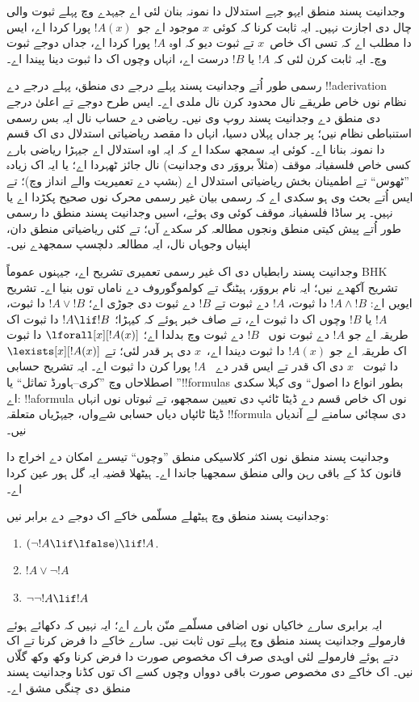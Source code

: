 \documentclass[../../../include/open-logic-section]{subfiles}
\begin{document}
وجدانیت پسند
منطق ایہو
جہے استدلال
دا نمونہ
بنان لئی
اے جیہدے
وچ پہلے
ثبوت والی
چال دی
اجازت نہیں۔
ایہ ثابت
کرنا کہ
کوئی $x$
موجود اے
جو~$!A(x)$
پورا کردا
اے، ایس
دا مطلب
اے کہ
تسی اک
خاص~$x$
تے ثبوت
دیو کہ
اوہ $!A$
پورا کردا
اے، جداں
دوجے ثبوت
وچ۔ ایہ
ثابت کرن
لئی کہ
$!A$ یا
$!B$ درست
اے، انہاں
وچوں اک
دا ثبوت
دینا پیندا
اے۔

رسمی طور
اُتے وجدانیت
پسند پہلے
درجے دی
منطق، پہلے
درجے دے
!!a{derivation}
نظام نوں
خاص طریقے
نال محدود
کرن نال
ملدی اے۔
ایس طرح
دوجے تے
اعلیٰ درجے
دی منطق
دے وجدانیت
پسند روپ
وی نیں۔
ریاضی دے
حساب نال
ایہ بس
رسمی استنباطی
نظام نیں؛
پر جداں
پہلاں دسیا،
انہاں دا
مقصد ریاضیاتی
استدلال دی
اک قسم
دا نمونہ
بنانا اے۔
کوئی ایہ
سمجھ سکدا
اے کہ ایہ
اوہ استدلال
اے جیہڑا
ریاضی بارے
کسی خاص
فلسفیانہ
موقف (مثلاً
برووَر دی
وجدانیت)
نال جائز
ٹھہردا اے؛
یا ایہ
اک زیادہ
”ٹھوس“
تے اطمینان
بخش ریاضیاتی
استدلال اے
(بشپ دے
تعمیریت
والے انداز
وچ)؛
تے ایس
اُتے بحث
وی ہو
سکدی اے
کہ رسمی
بیان غیر
رسمی محرک
نوں صحیح
پکڑدا اے
یا نہیں۔
پر ساڈا
فلسفیانہ
موقف کوئی
وی ہوئے،
اسیں وجدانیت
پسند منطق
دا رسمی
طور اُتے
پیش کیتی
منطق ونجوں
مطالعہ کر
سکدے آں؛
تے کئی
ریاضیاتی
منطق دان،
اپنیاں
وجوہاں نال،
ایہ مطالعہ
دلچسپ سمجھدے
نیں۔

وجدانیت پسند
رابطیاں دی
اک غیر رسمی
تعمیری تشریح
اے، جیہنوں
عموماً BHK
تشریح آکھدے
نیں؛ ایہ
نام برووَر،
ہیٹنگ تے
کولموگوروف
دے ناماں
توں بنیا
اے۔ تشریح
ایویں اے:
$!A
\land !B$
دا ثبوت،
$!A$ دے
ثبوت تے
$!B$ دے
ثبوت دی
جوڑی اے؛
$!A \lor !B$
دا ثبوت،
$!A$ یا
$!B$ وچوں
اک دا ثبوت
اے، تے
صاف خبر
ہوئے کہ
کیہڑا؛
$!A \lif !B$
دا ثبوت
اک طریقہ
اے جو
$!A$ دے
ثبوت نوں
~$!B$ دے
ثبوت وچ
بدلدا اے؛
$\lforall[x][!A(x)]$
دا ثبوت
اک طریقہ
اے جو
$!A(x)$ دا
ثبوت دیندا
اے،~$x$
دی ہر قدر
لئی؛
تے
$\lexists[x][!A(x)]$
دا ثبوت
~$x$ دی
اک قدر
تے ایس
قدر دے
~$!A$ پورا
کرن دا
ثبوت اے۔
ایہ تشریح
حسابی اصطلاحاں
وچ ”کری--ہاورڈ
تماثل“ یا
”!!{formula}s
بطور انواع
دا اصول“
وی کہلا
سکدی اے:
!!a{formula}
نوں اک
خاص قسم
دے ڈیٹا
ٹائپ دی
تعیین
سمجھو، تے
ثبوتاں نوں
انہاں ڈیٹا
ٹائپاں دیاں
حسابی شےواں،
جیہڑیاں
متعلقہ
!!{formula}
دی سچائی
سامنے لے
آندیاں
نیں۔

وجدانیت پسند
منطق نوں
اکثر کلاسیکی
منطق ”وچوں“
تیسرے امکان
دے اخراج دا
قانون کڈ
کے باقی
رہن والی
منطق سمجھیا
جاندا اے۔
ہیٹھلا قضیہ
ایہ گل
ہور عین
کردا اے۔
\begin{thm}
وجدانیت پسند
منطق وچ
ہیٹھلے مسلّمی
خاکے اک
دوجے دے
برابر نیں:
\begin{enumerate}
\item $(\lnot !A \lif \lfalse) \lif !A$.
\item $!A \lor \lnot !A$
\item $\lnot \lnot !A \lif !A$
\end{enumerate}
\end{thm}
ایہ برابری سارے خاکیاں نوں اضافی مسلّمے منّن بارے
اے؛ ایہ نہیں کہ دکھائے ہوئے فارمولے وجدانیت پسند
منطق وچ پہلے توں ثابت نیں۔ سارے خاکے دا فرض
کرنا تے اک دتے ہوئے فارمولے لئی اوہدی صرف اک
مخصوص صورت دا فرض کرنا وکھ وکھ گلّاں نیں۔
اک خاکے دی
مخصوص صورت
باقی دوواں
وچوں کسے
اک توں
کڈنا وجدانیت
پسند منطق
دی چنگی
مشق اے۔
\end{document}
